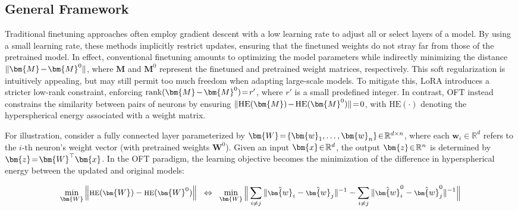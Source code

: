 \subsection{General Framework}

Traditional finetuning approaches often employ gradient descent with a low learning rate to adjust all or select layers of a model. By using a small learning rate, these methods implicitly restrict updates, ensuring that the finetuned weights do not stray far from those of the pretrained model. In effect, conventional finetuning amounts to optimizing the model parameters while indirectly minimizing the distance $\thickmuskip=2mu \medmuskip=2mu \| \bm{M} - \bm{M}^0\|$, where $\bm{M}$ and $\bm{M}^0$ represent the finetuned and pretrained weight matrices, respectively. This soft regularization is intuitively appealing, but may still permit too much freedom when adapting large-scale models. To mitigate this, LoRA introduces a stricter low-rank constraint, enforcing $\thickmuskip=2mu \medmuskip=2mu \text{rank}(\bm{M} - \bm{M}^0)=r'$, where $r'$ is a small predefined integer. In contrast, OFT instead constrains the similarity between pairs of neurons by ensuring $\thickmuskip=2mu \medmuskip=2mu \| \text{HE}(\bm{M})-\text{HE}(\bm{M}^0) \|=0$, with $\text{HE}(\cdot)$ denoting the hyperspherical energy associated with a weight matrix. 

For illustration, consider a fully connected layer parameterized by $\thickmuskip=2mu \medmuskip=2mu \bm{W}=\{\bm{w}_1,\ldots,\bm{w}_n\}\in\mathbb{R}^{d\times n}$, where each $\bm{w}_i\in\mathbb{R}^{d}$ refers to the $i$-th neuron's weight vector (with pretrained weights $\bm{W}^0$). Given an input $\thickmuskip=2mu \medmuskip=2mu \bm{x}\in\mathbb{R}^d$, the output $\thickmuskip=2mu \medmuskip=2mu \bm{z}\in\mathbb{R}^n$ is determined by $\thickmuskip=2mu \medmuskip=2mu \bm{z}=\bm{W}^\top\bm{x}$. In the OFT paradigm, the learning objective becomes the minimization of the difference in hyperspherical energy between the updated and original models:

\begin{equation}\label{eq:oft_principle}
\footnotesize
\min_{\bm{W}} \left\| \text{HE}(\bm{W})-\text{HE}(\bm{W}^0)\right\|~~\Leftrightarrow~~\min_{\bm{W}} \bigg{\|} \sum_{i\neq j} \|\hat{\bm{w}}_i-\hat{\bm{w}}_j\|^{-1}-\sum_{i\neq j} \|\hat{\bm{w}}^0_i-\hat{\bm{w}}^0_j\|^{-1}\bigg{\|}
\end{equation}

